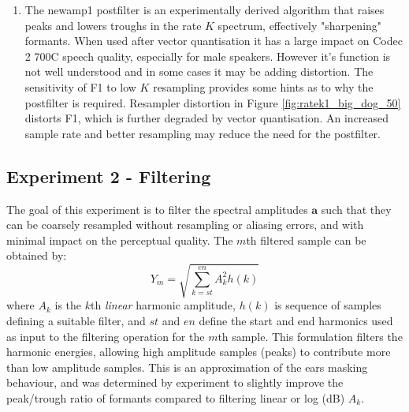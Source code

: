 \documentclass{article}
\begin{document}
\begin{enumerate}
\item The newamp1 postfilter is an experimentally derived algorithm that raises peaks and lowers troughs in the rate $K$ spectrum, effectively "sharpening" formants.  When used after vector quantisation it has a large impact on Codec 2 700C speech quality, especially for male speakers.  However it's function is not well understood and in some cases it may be adding distortion.  The sensitivity of F1 to low $K$ resampling provides some hints as to why the postfilter is required.  Resampler distortion in Figure \ref{fig:ratek1_big_dog_50} distorts F1, which is further degraded by vector quantisation.  An increased sample rate and better resampling may reduce the need for the postfilter.

\end{enumerate}

\subsection{Experiment 2 - Filtering}

The goal of this experiment is to filter the spectral amplitudes $\mathbf{a}$ such that they can be coarsely resampled without resampling or aliasing errors, and with minimal impact on the perceptual quality.
The $m$th filtered sample can be obtained by:
\begin{equation}
Y_m = \sqrt{\sum_{k=st}^{en}A_k^2 h(k)}
\end{equation}
where $A_k$ is the $k$th \emph{linear} harmonic amplitude, $h(k)$ is sequence of samples defining a suitable filter, and $st$ and $en$ define the start and end harmonics used as input to the filtering operation for the $m$th sample.  This formulation filters the harmonic energies, allowing high amplitude samples (peaks) to contribute more than low amplitude samples. This is an approximation of the ears masking behaviour, and was determined by experiment to slightly improve the peak/trough ratio of formants compared to filtering linear or log (dB) $A_k$.
\end{document}
